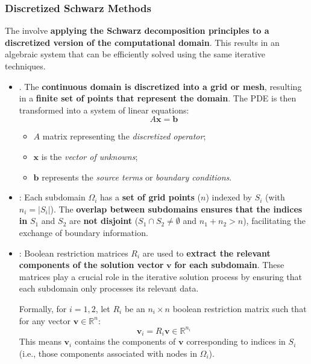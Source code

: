 \subsubsection{Discretized Schwarz Methods}

The  involve \textbf{applying the Schwarz decomposition principles to a discretized version of the computational domain}. This results in an algebraic system that can be efficiently solved using the same iterative techniques.

\begin{itemize}
    \item {}. The \textbf{continuous domain is discretized into a grid or mesh}, resulting in a \textbf{finite set of points that represent the domain}. The PDE is then transformed into a system of linear equations:
    \begin{equation*}
        A\mathbf{x} = \mathbf{b}
    \end{equation*}
    \begin{itemize}
        \item $A$ matrix representing the \emph{discretized operator};
        \item $\mathbf{x}$ is the \emph{vector of unknowns};
        \item $\mathbf{b}$ represents the \emph{source terms} or \emph{boundary conditions}.
    \end{itemize}


    \item {}: Each subdomain $\Omega_{i}$ has a \textbf{set of grid points} ($n$) indexed by $S_{i}$ (with $n_{i} = \left|S_{i}\right|$). The \textbf{overlap between subdomains ensures that the indices in} $ S_1 $ and $ S_2 $ are \textbf{not disjoint} ($S_{1} \cap S_{2} \ne \emptyset$ and $n_{1} + n_{2} > n$), facilitating the exchange of boundary information.


    \item {}: Boolean restriction matrices $ R_{i}$ are used to \textbf{extract the relevant components of the solution vector} $\mathbf{v}$ \textbf{for each subdomain}. These matrices play a crucial role in the iterative solution process by ensuring that each subdomain only processes its relevant data.

    Formally, for $i = 1, 2$, let $R_{i}$ be an $n_{i} \times n$ boolean restriction matrix such that for any vector $\mathbf{v} \in \mathbb{R}^{n}$:
    \begin{equation*}
        \mathbf{v}_{i} = R_{i} \mathbf{v} \in \mathbb{R}^{n_{i}}
    \end{equation*}
    This means $\mathbf{v}_{i}$ contains the components of $\mathbf{v}$ corresponding to indices in $ S_{i}$ (i.e., those components associated with nodes in $\Omega_{i}$).



\end{itemize}
